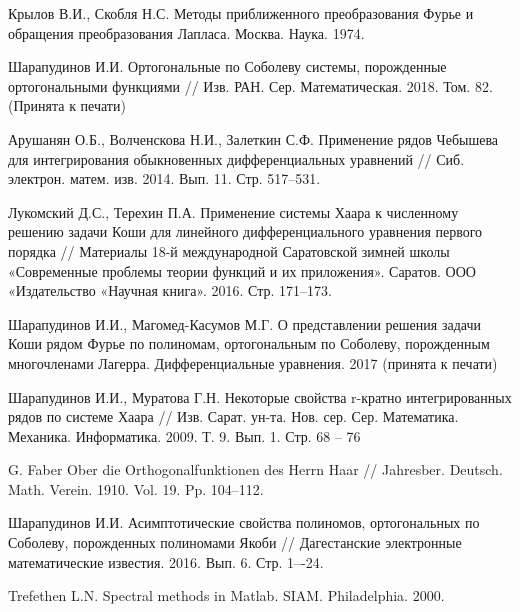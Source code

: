 \begin{thebibliography}{20}
{Крылов В.И., Скобля Н.С.}
Методы приближенного преобразования Фурье и обращения преобразования Лапласа. Москва. Наука. 1974.



Шарапудинов И.И. Ортогональные  по Соболеву системы, порожденные ортогональными функциями // Изв. РАН. Сер. Математическая. 2018. Том. 82. (Принята к печати)



{Арушанян О.Б., Волченскова Н.И., Залеткин С.Ф.}
Применение рядов Чебышева для интегрирования обыкновенных дифференциальных уравнений // Сиб. электрон. матем. изв. 2014. Вып. 11. Стр. 517--531.



{Лукомский Д.С., Терехин П.А.}
Применение системы Хаара к численному решению задачи Коши для линейного дифференциального уравнения первого порядка // Материалы 18-й международной Саратовской зимней школы «Современные проблемы теории функций и их приложения». Саратов. ООО «Издательство «Научная книга». 2016. Стр. 171--173.



{Шарапудинов И.И., Магомед-Касумов М.Г.}
О представлении решения задачи Коши  рядом Фурье  по полиномам, ортогональным по  Соболеву, порожденным многочленами Лагерра. Дифференциальные уравнения. 2017 (принята к печати)



{Шарапудинов И.И., Муратова Г.Н.}
Некоторые свойства r-кратно интегрированных рядов по системе Хаара // Изв. Сарат. ун-та. Нов. сер. Сер. Математика. Механика. Информатика. 2009. Т. 9. Вып. 1. Стр. 68 -- 76



{G. Faber}
Ober die Orthogonalfunktionen des Herrn Haar // Jahresber. Deutsch. Math. Verein. 1910. Vol. 19. Pp. 104--112.



{Шарапудинов И.И.}
Асимптотические свойства полиномов, ортогональных по Соболеву, порожденных полиномами Якоби // Дагестанские электронные математические известия. 2016. Вып. 6.	Стр. 1–-24.



{Trefethen L.N.}
Spectral methods in Matlab. SIAM. Philadelphia. 2000.




\end{thebibliography}
